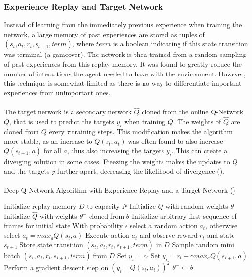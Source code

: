 \subsubsection{Experience Replay and Target Network} \label{sec:improvements}
Instead of learning from the immediately previous experience when training the network, a large memory of past experiences are stored as tuples of $(s_t, a_t, r_{t}, s_{t+1}, term)$, where $term$ is a boolean indicating if this state transition was terminal (a gameover). The network is then trained from a random sampling of past experiences from this replay memory. It was found to greatly reduce the number of interactions the agent needed to have with the environment. However, this technique is somewhat limited as there is no way to differentiate important experiences from unimportant ones. \paragraph{}

The target network is a secondary network $\hat{Q}$ cloned from the online Q-Network $Q$, that is used to predict the targets $y_i$ when training $Q$. The weights of $\hat{Q}$ are cloned from $Q$ every $\tau$ training steps. This modification makes the algorithm more stable, as an increase to $Q(s_t, a_t)$ was often found to also increase $Q(s_{t+1}, a)$ for all $a$, thus also increasing the targets $y_i$. This can create a diverging solution in some cases. Freezing the weights makes the updates to $Q$ and the targets $y$ further apart, decreasing the likelihood of divergence (\citet{human}). \paragraph{}

\begin{algorithm}
    \caption{Deep Q-Network Algorithm with Experience Replay and a Target Network (\citet{human})}\label{alg:DQN}
    \begin{algorithmic}[1]
        \State Initialize replay memory $D$ to capacity $N$
        \State Initialize $Q$ with random weights $\theta$
        \State Initialize $\hat{Q}$ with weights $\theta^-$ cloned from $\theta$
        \State Initialize arbitrary first sequence of frames for initial state
        \State With probability $\epsilon$ select a random action $a_t$, otherwise select $a_t = max_a Q(s_t, a)$
        \State Execute action $a_t$ and observe reward $r_t$ and state $s_{t+1}$
        \State Store state transition $(s_t, a_t, r_t, s_{t+1}, term)$ in $D$
        \State Sample random mini batch $(s_i, a_i, r_i, s_{i + 1}, term)$ from $D$
        \State Set $y_i = r_i$
        \Else
        \State Set $y_i = r_i + \gamma max_a Q(s_{i+1}, a)$ \label{DQN:target}
        \EndIf
        \EndFor
        \State Perform a gradient descent step on $(y_i - Q(s_i, a_i))^2$
        $\theta^- \leftarrow \theta$
        \EndIf
        \EndFor
    \end{algorithmic}
\end{algorithm}

